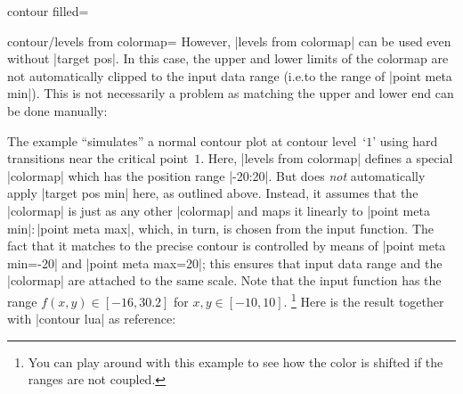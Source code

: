 {{\begin{plottype}[/pgfplots]{
    contour filled=\textcolor{black}{}%
}
\begin{pgfplotskey}{contour/levels from colormap=}
        However, |levels from colormap| can be used even without |target pos|.
        In this case, the upper and lower limits of the colormap are not
        automatically clipped to the input data range (i.e.\@ to the range of
        |point meta min|). This is not necessarily a problem as matching the
        upper and lower end can be done manually:
\pgfplotsexpensiveexample
\begin{codeexample}[]
\end{codeexample}
        The example ``simulates'' a normal contour plot at contour level~`$1$'
        using hard transitions near the critical point~$1$. Here,
        |levels from colormap| defines a special |colormap| which has the
        position range |-20:20|. But \PGFPlots{} does \emph{not} automatically
        apply |target pos min| here, as outlined above. Instead, it assumes
        that the |colormap| is just as any other |colormap| and maps it
        linearly to |point meta min|$:$|point meta max|, which, in turn, is
        chosen from the input function. The fact that it matches to the precise
        contour is controlled by means of |point meta min=-20| and
        |point meta max=20|; this ensures that input data range and the
        |colormap| are attached to the same scale. Note that the input
        function has the range $f(x,y) \in [-16,30.2]$ for $x,y \in [-10,10]$.
        \footnote{You can play around with this example to see how the color is
        shifted if the ranges are not coupled.} Here is the result together
        with |contour lua| as reference:
\pgfplotsexpensiveexample
\begin{codeexample}[]
\end{codeexample}
\end{pgfplotskey}
\end{plottype}}}
